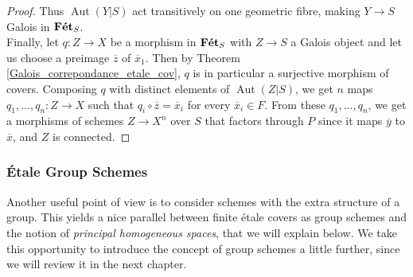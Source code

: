 \documentclass{article}
\theoremstyle{plain}
\theoremstyle{definition}
\DeclareMathOperator{\Aut}{Aut}
\DeclareMathOperator{\Fet}{\bf{F\acute{e}t}}
\begin{document}
\begin{proof}
    Thus $\Aut(Y|S)$ act transitively on one geometric fibre, making $Y\rightarrow S$ Galois in $\Fet_S$.\\
    Finally, let $q:Z\rightarrow X$ be a morphism in $\Fet_S$ with $Z\rightarrow S$ a Galois object and let us choose a preimage $\overline{z}$ of $\overline{x}_1$. Then by Theorem \ref{Galois_correpondance_etale_cov}, $q$ is in particular a surjective morphism of covers.
    Composing $q$ with distinct elements of $\Aut(Z|S)$, we get $n$ maps $q_1, ..., q_n : Z\rightarrow X$ such that $q_i\circ \overline{z} = \overline{x}_i$ for every $\overline{x}_i\in F$.
    From these $q_1,...,q_n$, we get a morphisms of schemes $Z\rightarrow X^n$ over $S$ that factors through $P$ since it maps $\overline{y}$ to $\overline{x}$, and $Z$ is connected.
\end{proof}






\subsubsection{\'Etale Group Schemes}
\label{etale_group_scheme}

Another useful point of view is to consider schemes with the extra structure of a group. 
This yields a nice parallel between finite \'etale covers as group schemes and the notion of \textit{principal homogeneous spaces}, that we will explain below.
We take this opportunity to introduce the concept of group schemes a little further, since we will review it in the next chapter.
\end{document}
